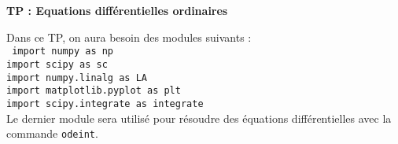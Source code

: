 \documentclass[12pt]{article}
\begin{document}
\setcounter{page}{1}\noindent 
\univ\hfill
\annee \\
\cours\hfill \\
\coursbis \hfill
\par\bigskip

\par\bigskip
\begin{center}
\Large{ \bf TP : Equations diff\'erentielles ordinaires}
\end{center}

Dans ce TP, on aura besoin des modules suivants : \\ 
\texttt{
import numpy as np \\
import scipy as sc\\
import numpy.linalg as LA\\
import matplotlib.pyplot as plt \\
import scipy.integrate as integrate \vspace{0.3cm}\\
}
Le dernier module sera utilis\'e pour r\'esoudre des \'equations diff\'erentielles avec la commande \texttt{odeint}. 
\end{document}
